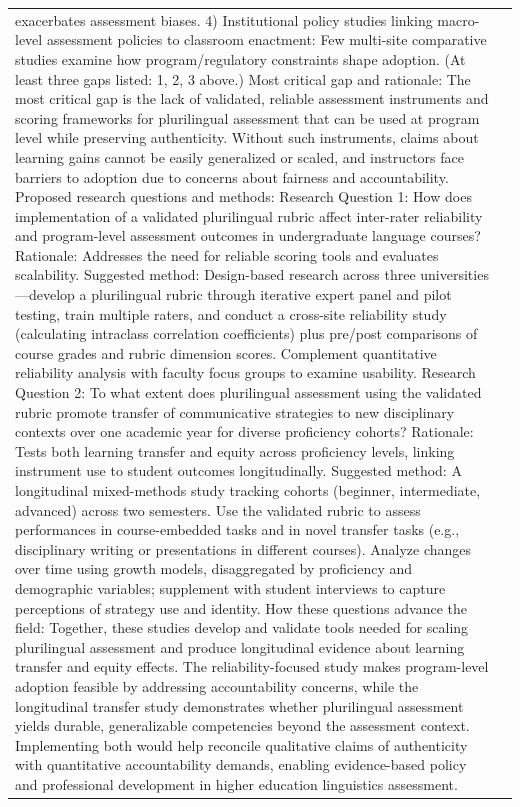 \begin{longtable}{@{}l p{13cm}@{}}
exacerbates assessment biases. 4) Institutional policy studies linking macro-level assessment policies to classroom enactment: Few multi-site comparative studies examine how program/regulatory constraints shape adoption. (At least three gaps listed: 1, 2, 3 above.) Most critical gap and rationale: The most critical gap is the lack of validated, reliable assessment instruments and scoring frameworks for plurilingual assessment that can be used at program level while preserving authenticity. Without such instruments, claims about learning gains cannot be easily generalized or scaled, and instructors face barriers to adoption due to concerns about fairness and accountability. Proposed research questions and methods: Research Question 1: How does implementation of a validated plurilingual rubric affect inter-rater reliability and program-level assessment outcomes in undergraduate language courses? Rationale: Addresses the need for reliable scoring tools and evaluates scalability. Suggested method: Design-based research across three universities---develop a plurilingual rubric through iterative expert panel and pilot testing, train multiple raters, and conduct a cross-site reliability study (calculating intraclass correlation coefficients) plus pre/post comparisons of course grades and rubric dimension scores. Complement quantitative reliability analysis with faculty focus groups to examine usability. Research Question 2: To what extent does plurilingual assessment using the validated rubric promote transfer of communicative strategies to new disciplinary contexts over one academic year for diverse proficiency cohorts? Rationale: Tests both learning transfer and equity across proficiency levels, linking instrument use to student outcomes longitudinally. Suggested method: A longitudinal mixed-methods study tracking cohorts (beginner, intermediate, advanced) across two semesters. Use the validated rubric to assess performances in course-embedded tasks and in novel transfer tasks (e.g., disciplinary writing or presentations in different courses). Analyze changes over time using growth models, disaggregated by proficiency and demographic variables; supplement with student interviews to capture perceptions of strategy use and identity. How these questions advance the field: Together, these studies develop and validate tools needed for scaling plurilingual assessment and produce longitudinal evidence about learning transfer and equity effects. The reliability-focused study makes program-level adoption feasible by addressing accountability concerns, while the longitudinal transfer study demonstrates whether plurilingual assessment yields durable, generalizable competencies beyond the assessment context. Implementing both would help reconcile qualitative claims of authenticity with quantitative accountability demands, enabling evidence-based policy and professional development in higher education linguistics assessment.      \\

\end{longtable}
